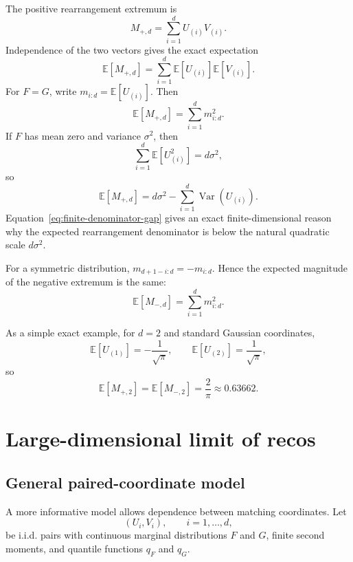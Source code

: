 \documentclass[11pt,a4paper]{article}
\newcommand{\E}{\mathbb{E}}
\newcommand{\Var}{\operatorname{Var}}
\begin{document}
The positive rearrangement extremum is
\begin{equation}
    M_{+,d}=\sum_{i=1}^d U_{(i)}V_{(i)}.
\end{equation}
Independence of the two vectors gives the exact expectation
\begin{equation}
    \E[M_{+,d}]
    =\sum_{i=1}^d
    \E[U_{(i)}]\E[V_{(i)}].
\label{eq:expected-max}
\end{equation}
For $F=G$, write $m_{i:d}=\E[U_{(i)}]$. Then
\begin{equation}
    \E[M_{+,d}]=\sum_{i=1}^d m_{i:d}^2.
\end{equation}
If $F$ has mean zero and variance $\sigma^2$, then
\begin{equation}
    \sum_{i=1}^d \E[U_{(i)}^2]=d\sigma^2,
\end{equation}
so
\begin{equation}
    \E[M_{+,d}]
    =d\sigma^2-
    \sum_{i=1}^d\Var(U_{(i)}).
\label{eq:finite-denominator-gap}
\end{equation}
Equation~\eqref{eq:finite-denominator-gap} gives an exact finite-dimensional reason why the expected rearrangement denominator is below the natural quadratic scale $d\sigma^2$.

For a symmetric distribution, $m_{d+1-i:d}=-m_{i:d}$. Hence the expected magnitude of the negative extremum is the same:
\begin{equation}
    \E[M_{-,d}]
    =\sum_{i=1}^d m_{i:d}^2.
\end{equation}

As a simple exact example, for $d=2$ and standard Gaussian coordinates,
\begin{equation}
    \E[U_{(1)}]=-\frac{1}{\sqrt{\pi}},
    \qquad
    \E[U_{(2)}]=\frac{1}{\sqrt{\pi}},
\end{equation}
so
\begin{equation}
    \E[M_{+,2}]=\E[M_{-,2}]=\frac{2}{\pi}\approx0.63662.
\end{equation}

\section{Large-dimensional limit of recos}

\subsection{General paired-coordinate model}

A more informative model allows dependence between matching coordinates. Let
\begin{equation}
    (U_i,V_i),\qquad i=1,\ldots,d,
\end{equation}
be i.i.d. pairs with continuous marginal distributions $F$ and $G$, finite second moments, and quantile functions $q_F$ and $q_G$.
\end{document}
